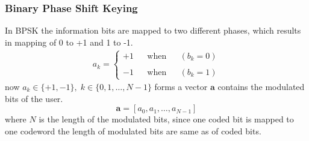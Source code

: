 \subsubsection{Binary Phase Shift Keying} 
In BPSK the information bits are mapped to two different phases, which results in mapping of 0 to +1 and 1 to -1.
\begin{eqnarray}
a_k=\left \{
\begin{array}{lllll}
+1&& \mathrm{when}&& (b_k=0) \\ \\
-1&& \mathrm{when}&& (b_k=1) 
\end{array}
\right .
\end{eqnarray}
now $a_k\in\{+1,-1\},\;k\in\{0,1,\dots,N-1\}$ forms a vector $\mathrm{\mathbf{a}}$ contains the modulated bits of the user.
\begin{equation}
\mathrm{\mathbf{a}} = [a_0,a_1,\dots,a_{N-1}]
\end{equation}
where $N$ is the length of the modulated bits, since one coded bit is mapped to one codeword the length of modulated bits are same as of coded bits.
